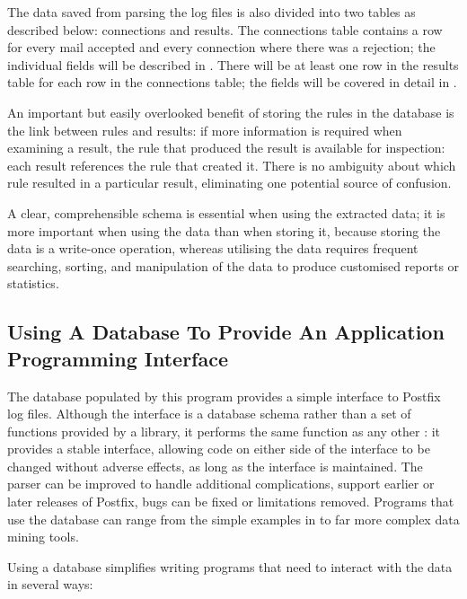 The data saved from parsing the log files is also divided into two tables
as described below: connections and results.  The connections table
contains a row for every mail accepted and every connection where there was
a rejection; the individual fields will be described in
.  There will be at least one row in the
results table for each row in the connections table; the fields will be
covered in detail in .

An important but easily overlooked benefit of storing the rules in the
database is the link between rules and results: if more information is
required when examining a result, the rule that produced the result is
available for inspection: each result references the rule that created it.
There is no ambiguity about which rule resulted in a particular result,
eliminating one potential source of confusion.

A clear, comprehensible schema is essential when using the extracted data;
it is more important when using the data than when storing it, because
storing the data is a write-once operation, whereas utilising the data
requires frequent searching, sorting, and manipulation of the data to
produce customised reports or statistics.

\subsection{Using A Database To Provide An Application Programming Interface}

\label{database as API}

The database populated by this program provides a simple interface to
Postfix log files.  Although the interface is a database schema rather than
a set of functions provided by a library, it performs the same function as
any other : it provides a stable interface, allowing code on
either side of the interface to be changed without adverse effects, as long
as the interface is maintained.  The parser can be improved to handle
additional complications, support earlier or later releases of Postfix,
bugs can be fixed or limitations removed.  Programs that use the database
can range from the simple examples in  to far more
complex data mining tools.

Using a database simplifies writing programs that need to interact with the
data in several ways:

